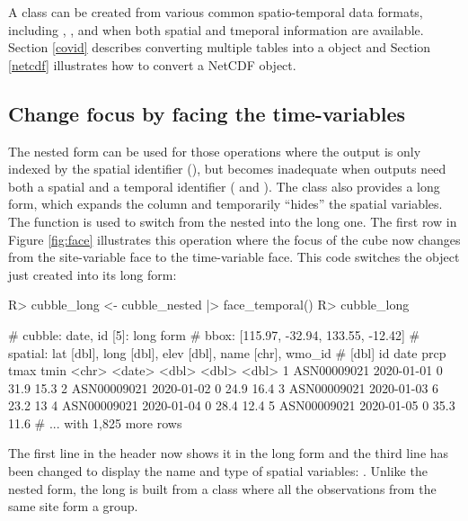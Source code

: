 \documentclass[
  shortnames]{jss}
\begin{document}
A  class can be created from various common spatio-temporal data formats, including , , and  when both spatial and tmeporal information are available. Section \ref{covid} describes converting multiple tables into a  object and Section \ref{netcdf} illustrates how to convert a NetCDF object.

\hypertarget{change-focus-by-facing-the-time-variables}{%
\subsection{Change focus by facing the time-variables}\label{change-focus-by-facing-the-time-variables}}

The nested form can be used for those operations where the output is only indexed by the spatial identifier (), but becomes inadequate when outputs need both a spatial and a temporal identifier ( and ). The  class also provides a long form, which expands the  column and temporarily ``hides'' the spatial variables. The function  is used to switch from the nested  into the long one. The first row in Figure \ref{fig:face} illustrates this operation where the focus of the cube now changes from the site-variable face to the time-variable face. This code switches the  object just created into its long form:

\begin{CodeChunk}
\begin{CodeInput}
R> cubble_long <- cubble_nested |> face_temporal()
R> cubble_long
\end{CodeInput}
\begin{CodeOutput}
# cubble:  date, id [5]: long form
# bbox:    [115.97, -32.94, 133.55, -12.42]
# spatial: lat [dbl], long [dbl], elev [dbl], name [chr], wmo_id
#   [dbl]
  id          date        prcp  tmax  tmin
  <chr>       <date>     <dbl> <dbl> <dbl>
1 ASN00009021 2020-01-01     0  31.9  15.3
2 ASN00009021 2020-01-02     0  24.9  16.4
3 ASN00009021 2020-01-03     6  23.2  13  
4 ASN00009021 2020-01-04     0  28.4  12.4
5 ASN00009021 2020-01-05     0  35.3  11.6
# ... with 1,825 more rows
\end{CodeOutput}
\end{CodeChunk}

The first line in the header now shows it in the long form and the third line has been changed to display the name and type of spatial variables: . Unlike the nested form, the long  is built from a  class where all the observations from the same site form a group.
\end{document}
